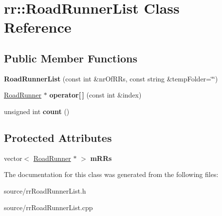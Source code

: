\hypertarget{classrr_1_1_road_runner_list}{\section{rr\-:\-:Road\-Runner\-List Class Reference}
\label{classrr_1_1_road_runner_list}
}
\subsection*{Public Member Functions}
\begin{DoxyCompactItemize}
\item 
\hypertarget{classrr_1_1_road_runner_list_afdd31787646be2f514366e6e97bae74f}{{\bfseries Road\-Runner\-List} (const int \&nr\-Of\-R\-Rs, const string \&temp\-Folder=\char`\"{}\char`\"{})}\label{classrr_1_1_road_runner_list_afdd31787646be2f514366e6e97bae74f}

\item 
\hypertarget{classrr_1_1_road_runner_list_a950864d27a6a2ed579dc74670a0fd736}{\hyperlink{classrr_1_1_road_runner}{Road\-Runner} $\ast$ {\bfseries operator\mbox{[}$\,$\mbox{]}} (const int \&index)}\label{classrr_1_1_road_runner_list_a950864d27a6a2ed579dc74670a0fd736}

\item 
\hypertarget{classrr_1_1_road_runner_list_a1b94bfdb123d4bcee27a50608663b9e6}{unsigned int {\bfseries count} ()}\label{classrr_1_1_road_runner_list_a1b94bfdb123d4bcee27a50608663b9e6}

\end{DoxyCompactItemize}
\subsection*{Protected Attributes}
\begin{DoxyCompactItemize}
\item 
\hypertarget{classrr_1_1_road_runner_list_a0941ebdb4e753bbab4ac67e909e8b3ce}{vector$<$ \hyperlink{classrr_1_1_road_runner}{Road\-Runner} $\ast$ $>$ {\bfseries m\-R\-Rs}}\label{classrr_1_1_road_runner_list_a0941ebdb4e753bbab4ac67e909e8b3ce}

\end{DoxyCompactItemize}


The documentation for this class was generated from the following files\-:\begin{DoxyCompactItemize}
\item 
source/rr\-Road\-Runner\-List.\-h\item 
source/rr\-Road\-Runner\-List.\-cpp\end{DoxyCompactItemize}
